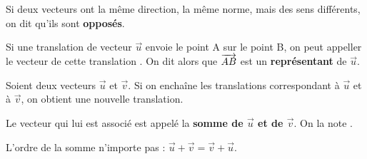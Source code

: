 \documentclass[
	classe=$2^{de}$,
	headerTitle=Généralités\space sur\space les\space vecteurs
]{coursclass}
\begin{document}
\begin{definition}
	Si deux vecteurs ont la même direction, la même norme, mais des sens différents, on dit qu'ils sont \textbf{opposés}.
\end{definition}

\begin{vocabulaire}
	\begin{center}
	\end{center}

	Si une translation de vecteur $\vec{u}$ envoie le point A sur le point B, on peut appeller le vecteur de cette translation . On dit alors que $\overrightarrow{AB}$ est un \textbf{représentant} de $\vec{u}$.
\end{vocabulaire}

\begin{definition}
	Soient deux vecteurs $\vec{u}$ et $\vec{v}$. Si on enchaîne les translations correspondant à $\vec{u}$ et à $\vec{v}$, on obtient une nouvelle translation.

	Le vecteur qui lui est associé est appelé la \textbf{somme de $\vec{u}$ et de $\vec{v}$}. On la note .
\end{definition}

\begin{exemple}
	\begin{center}
	\end{center}
\end{exemple}

\begin{remarque}
	L'ordre de la somme n'importe pas : $\vec{u} + \vec{v} = \vec{v} + \vec{u}$.

	\begin{center}
	\end{center}
\end{remarque}
\end{document}
